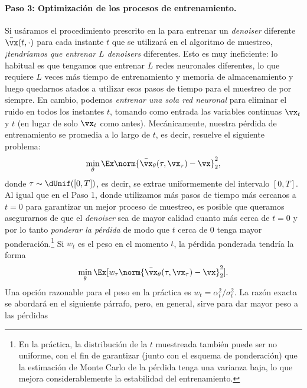 \documentclass[../../book-main.tex]{subfiles}
\begin{document}
\paragraph{Paso 3: Optimización de los procesos de entrenamiento.} Si usáramos el
procedimiento prescrito en la  para entrenar un
\textit{denoiser} diferente \(\bar{\vx}(t, \cdot)\) para cada instante \(t\) que se
utilizará en el algoritmo de muestreo, \textit{¡tendríamos que entrenar \(L\) \textit{denoisers}}
diferentes. Esto es muy ineficiente: lo habitual es
que tengamos que entrenar \(L\) redes neuronales diferentes, lo que requiere \(L\)
veces más tiempo de entrenamiento y memoria de almacenamiento y luego quedarnos atados a
utilizar esos pasos de tiempo para el muestreo de por siempre. En cambio, podemos
\textit{entrenar una sola red neuronal} para eliminar el ruido en todos los instantes
\(t\), tomando como entrada las variables continuas \(\vx_{t}\) y \(t\)
(en lugar de solo \(\vx_{t}\) como antes). Mecánicamente, nuestra pérdida de entrenamiento
se promedia a lo largo de \(t\), es decir, resuelve el siguiente problema:
\begin{equation}\label{eq:training loss}
    \min_{\theta}\Ex\norm{\bar{\vx}_{\theta}(\tau,
    \vx_{\tau}) - \vx}_{2}^{2},
\end{equation}
donde \(\tau \sim \dUnif([0, T])\), es decir, se extrae uniformemente del intervalo \([0, T]\).
Al igual que en el Paso 1, donde utilizamos más pasos de tiempo más cercanos a \(t = 0\)
para garantizar un mejor proceso de muestreo, es posible que queramos asegurarnos de que el
\textit{denoiser} sea de mayor calidad cuanto más cerca de \(t = 0\) y por lo tanto
\textit{ponderar la pérdida} de modo que \(t\) cerca de \(0\) tenga mayor
ponderación.\footnote{En la práctica, la distribución de la \(t\) muestreada también puede
    ser no uniforme, con el fin de garantizar (junto con el
    esquema de ponderación) que la estimación de Monte Carlo de la pérdida tenga
una varianza baja, lo que mejora considerablemente la estabilidad del entrenamiento.}
Si \(w_{t}\) es el peso en el momento \(t\), la pérdida ponderada tendría la forma
\begin{equation}\label{eq:parametric_denoising_loss}
    \min_{\theta}\Ex[w_{\tau}\norm{\bar{\vx}_{\theta}(\tau,
    \vx_{\tau}) - \vx}_{2}^{2}].
\end{equation}
Una opción razonable para el peso en la práctica es \(w_{t} =
\alpha_{t}^{2}/\sigma_{t}^{2}\). La razón exacta se abordará en el
siguiente párrafo, pero, en general, sirve para dar mayor peso a las pérdidas
\end{document}
